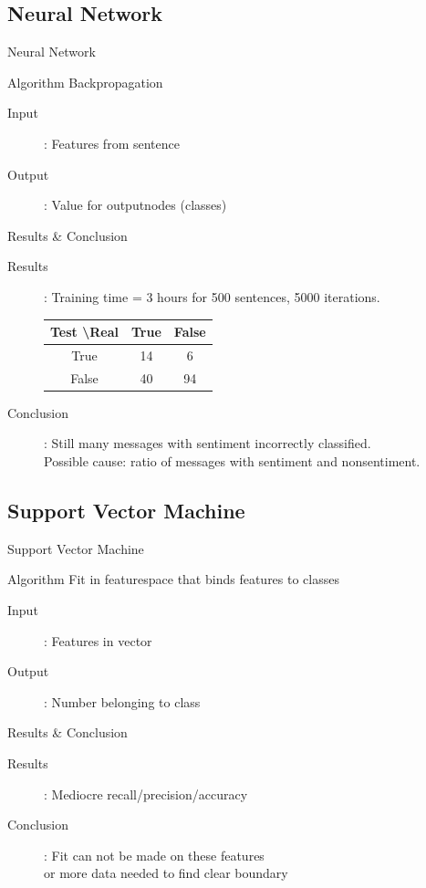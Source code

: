 \documentclass{beamer}
\begin{document}
\subsection{Neural Network}
\begin{frame}{Neural Network}
\begin{block}{Algorithm}
Backpropagation
\end{block}
\begin{description}
\item[Input]: Features from sentence
\item[Output]: Value for outputnodes (classes)
\end{description}
\end{frame}
\begin{frame}{Results \& Conclusion}
\begin{description}
\item[Results]: Training time = 3 hours for 500 sentences, 5000 iterations.\\
\begin{tabular}{c || c | c}\\
Test \textbackslash Real & True & False \\
\hline
True & 14 & 6 \\
False & 40 & 94 \\
\end{tabular}

\item[Conclusion]: Still many messages with sentiment incorrectly classified. \\Possible cause: ratio of messages with sentiment and nonsentiment.\\
\end{description}
\end{frame}

\subsection{Support Vector Machine}
\begin{frame}{Support Vector Machine}
\begin{block}{Algorithm}
Fit in featurespace that binds features to classes
\end{block}
\begin{description}
\item[Input]: Features in vector
\item[Output]: Number belonging to class
\end{description}
\end{frame}
\begin{frame}{Results \& Conclusion}
\begin{description}
\item[Results]: Mediocre recall/precision/accuracy
\item[Conclusion]: Fit can not be made on these features\\ or more data needed to find clear boundary 
\end{description}
\end{frame}
\end{document}
